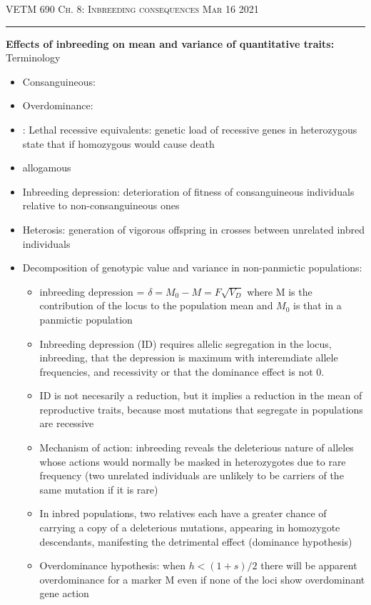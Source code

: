 \documentclass[12pt]{amsart}
\begin{document}
\thispagestyle{empty}

{\scshape VETM 690} \hfill {\scshape \Large  Ch. 8: Inbreeding consequences} \hfill {\scshape Mar 16 2021}
\medskip
\hrule
\bigskip

{\large \bf Effects of inbreeding on mean and variance of quantitative traits:}
Terminology
\begin{itemize}
\item Consanguineous:
\item Overdominance: 
\item: Lethal recessive equivalents: genetic load of recessive genes in heterozygous state that if homozygous would cause death
\item allogamous
\end{itemize}

\begin{itemize}
\item Inbreeding depression: deterioration of fitness of consanguineous individuals relative to non-consanguineous ones
\item Heterosis: generation of vigorous offspring in crosses between unrelated inbred individuals
\item Decomposition of genotypic value and variance in non-panmictic populations:
\begin{itemize}
\item inbreeding depression = $\delta = M_0 - M = F\sqrt{V_D}$ where M is the contribution of the locus to the population mean and $M_0$ is that in a panmictic population
\item Inbreeding depression (ID) requires allelic segregation in the locus, inbreeding, that the depression is maximum with interemdiate allele frequencies, and recessivity or that the dominance effect is not 0.
\item ID is not necesarily a reduction, but it implies a reduction in the mean of reproductive traits, because most mutations that segregate in populations are recessive
\item Mechanism of action: inbreeding reveals the deleterious nature of alleles whose actions would normally be masked in heterozygotes due to rare frequency (two unrelated individuals are unlikely to be carriers of the same mutation if it is rare)
\item In inbred populations, two relatives each have a greater chance of carrying a copy of a deleterious mutations, appearing in homozygote descendants, manifesting the detrimental effect (dominance hypothesis)
\item Overdominance hypothesis: when $h < (1+s)/2$ there will be apparent overdominance for a marker M even if none of the loci show overdominant gene action

\end{itemize}
\end{itemize}
\end{document}

